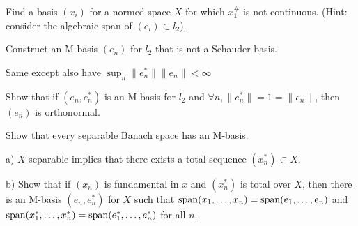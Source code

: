 \documentclass{article}
\begin{document}
 Find a basis $(x_i)$ for a normed space $X$ for which $x_1^\#$ is not continuous. (Hint: consider the algebraic span of $(e_i) \subset l_2$).

 Construct an M-basis $(e_n)$ for $l_2$ that is not a Schauder basis.

 Same except also have $\sup_n \|e_n^*\| \|e_n\| < \infty$

 Show that if $(e_n, e_n^*)$ is an M-basis for $l_2$ and $\forall n, \|e_n^*\| = 1 = \| e_n \|$, then $(e_n)$ is orthonormal.

 Show that every separable Banach space has an M-basis.

a) $X$ separable implies that there exists a total sequence $(x_n^*) \subset X$.

b) Show that if $(x_n)$ is fundamental in $x$ and $(x_n^*)$ is total over $X$, then there is an M-basis $(e_n, e_n^*)$ for $X$ such that 
$\operatorname{span}(x_1, \ldots, x_n) = \operatorname{span}(e_1, \ldots, e_n) $ and
$\operatorname{span}(x_1^*, \ldots, x_n^*) = \operatorname{span}(e_1^*, \ldots, e_n^*)$ for all $n$.
\end{document}
